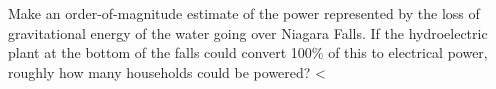  Make an order-of-magnitude estimate of the power
represented by the loss of gravitational energy of the water
going over Niagara Falls. If the hydroelectric plant
at the bottom of the falls could convert 100\% of this
to electrical power, roughly how many households could be powered?
<%
